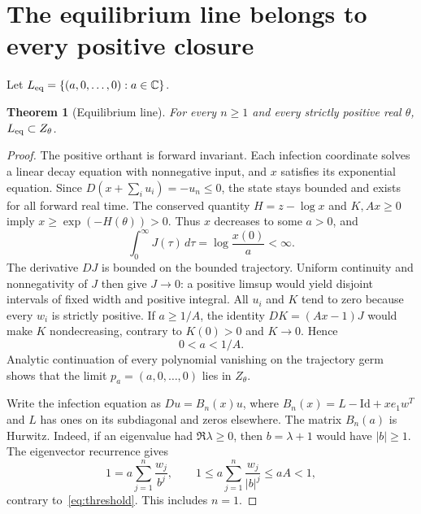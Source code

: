 \documentclass[11pt]{article}
\newtheorem{theorem}{Theorem}[section]
\theoremstyle{remark}\newtheorem{remark}[theorem]{Remark}
\newcommand{\C}{\mathbb C}
\begin{document}
\section{The equilibrium line belongs to every positive closure}\label{sec:EL}
Let $L_{\rm eq}=\{(a,0,\ldots,0):a\in\C\}$.
\begin{theorem}[Equilibrium line]\label{thm:EL}
For every $n\geq1$ and every strictly positive real $\theta$, $L_{\rm eq}\subset Z_\theta$.
\end{theorem}
\begin{proof}
The positive orthant is forward invariant. Each infection coordinate solves a linear decay equation with nonnegative input, and $x$ satisfies its exponential equation. Since $D(x+\sum_i u_i)=-u_n\leq0$, the state stays bounded and exists for all forward real time. The conserved quantity $H=z-\log x$ and $K,Ax\geq0$ imply $x\geq\exp(-H(\theta))>0$. Thus $x$ decreases to some $a>0$, and
\[
 \int_0^\infty J(\tau)\,d\tau=\log\frac{x(0)}a<\infty.
\]
The derivative $DJ$ is bounded on the bounded trajectory. Uniform continuity and nonnegativity of $J$ then give $J\to0$: a positive limsup would yield disjoint intervals of fixed width and positive integral. All $u_i$ and $K$ tend to zero because every $w_i$ is strictly positive. If $a\geq1/A$, the identity $DK=(Ax-1)J$ would make $K$ nondecreasing, contrary to $K(0)>0$ and $K\to0$. Hence
\begin{equation}\label{eq:threshold}
 0<a<1/A.
\end{equation}
Analytic continuation of every polynomial vanishing on the trajectory germ shows that the limit $p_a=(a,0,\ldots,0)$ lies in $Z_\theta$.

Write the infection equation as $Du=B_n(x)u$, where $B_n(x)=L-\mathrm{Id}+xe_1w^T$ and $L$ has ones on its subdiagonal and zeros elsewhere. The matrix $B_n(a)$ is Hurwitz. Indeed, if an eigenvalue had $\Re\lambda\geq0$, then $b=\lambda+1$ would have $|b|\geq1$. The eigenvector recurrence gives
\[
 1=a\sum_{j=1}^n\frac{w_j}{b^j},\qquad
 1\leq a\sum_{j=1}^n\frac{w_j}{|b|^j}\leq aA<1,
\]
contrary to~\eqref{eq:threshold}. This includes $n=1$.


\end{proof}
\end{document}
